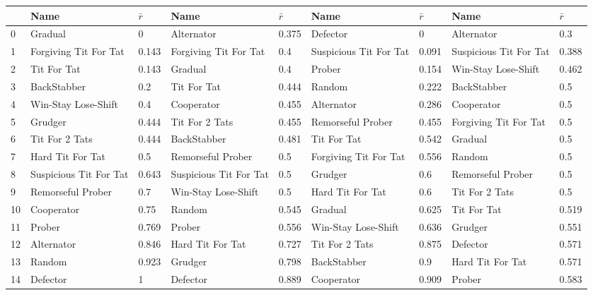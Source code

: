 \begin{tabular}{lllllllll}
\toprule
{} &                    Name & $\bar{r}$ &                    Name & $\bar{r}$ &                    Name & $\bar{r}$ &                    Name & $\bar{r}$ \\
\midrule
0  &                 Gradual &         0 &              Alternator &     0.375 &                Defector &         0 &              Alternator &       0.3 \\
1  &   Forgiving Tit For Tat &     0.143 &   Forgiving Tit For Tat &       0.4 &  Suspicious Tit For Tat &     0.091 &  Suspicious Tit For Tat &     0.388 \\
2  &             Tit For Tat &     0.143 &                 Gradual &       0.4 &                  Prober &     0.154 &     Win-Stay Lose-Shift &     0.462 \\
3  &             BackStabber &       0.2 &             Tit For Tat &     0.444 &                  Random &     0.222 &             BackStabber &       0.5 \\
4  &     Win-Stay Lose-Shift &       0.4 &              Cooperator &     0.455 &              Alternator &     0.286 &              Cooperator &       0.5 \\
5  &                 Grudger &     0.444 &          Tit For 2 Tats &     0.455 &       Remorseful Prober &     0.455 &   Forgiving Tit For Tat &       0.5 \\
6  &          Tit For 2 Tats &     0.444 &             BackStabber &     0.481 &             Tit For Tat &     0.542 &                 Gradual &       0.5 \\
7  &        Hard Tit For Tat &       0.5 &       Remorseful Prober &       0.5 &   Forgiving Tit For Tat &     0.556 &                  Random &       0.5 \\
8  &  Suspicious Tit For Tat &     0.643 &  Suspicious Tit For Tat &       0.5 &                 Grudger &       0.6 &       Remorseful Prober &       0.5 \\
9  &       Remorseful Prober &       0.7 &     Win-Stay Lose-Shift &       0.5 &        Hard Tit For Tat &       0.6 &          Tit For 2 Tats &       0.5 \\
10 &              Cooperator &      0.75 &                  Random &     0.545 &                 Gradual &     0.625 &             Tit For Tat &     0.519 \\
11 &                  Prober &     0.769 &                  Prober &     0.556 &     Win-Stay Lose-Shift &     0.636 &                 Grudger &     0.551 \\
12 &              Alternator &     0.846 &        Hard Tit For Tat &     0.727 &          Tit For 2 Tats &     0.875 &                Defector &     0.571 \\
13 &                  Random &     0.923 &                 Grudger &     0.798 &             BackStabber &       0.9 &        Hard Tit For Tat &     0.571 \\
14 &                Defector &         1 &                Defector &     0.889 &              Cooperator &     0.909 &                  Prober &     0.583 \\
\bottomrule
\end{tabular}
